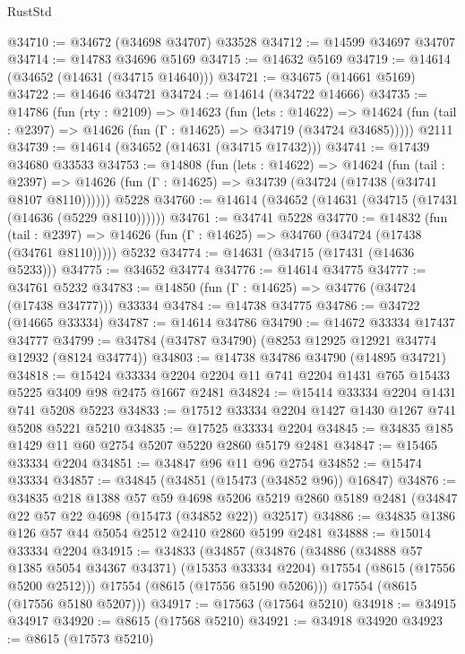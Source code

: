\begin{lexlean}{RustStd}
\begin{coremodule}
@34710 := @34672 (@34698 @34707) @33528
@34712 := @14599 @34697 @34707
@34714 := @14783 @34696 @5169
@34715 := @14632 @5169
@34719 := @14614 (@34652 (@14631 (@34715 @14640)))
@34721 := @34675 (@14661 @5169)
@34722 := @14646 @34721
@34724 := @14614 (@34722 @14666)
@34735 := @14786
    (fun (rty : @2109) =>
    @14623
      (fun (lets : @14622) =>
      @14624 (fun (tail : @2397) => @14626 (fun (Γ : @14625) => @34719 (@34724 @34685)))))
    @2111
@34739 := @14614 (@34652 (@14631 (@34715 @17432)))
@34741 := @17439 @34680 @33533
@34753 := @14808
    (fun (lets : @14622) =>
    @14624
      (fun (tail : @2397) =>
      @14626 (fun (Γ : @14625) => @34739 (@34724 (@17438 (@34741 @8107 @8110))))))
    @5228
@34760 := @14614 (@34652 (@14631 (@34715 (@17431 (@14636 (@5229 @8110))))))
@34761 := @34741 @5228
@34770 := @14832
    (fun (tail : @2397) => @14626 (fun (Γ : @14625) => @34760 (@34724 (@17438 (@34761 @8110)))))
    @5232
@34774 := @14631 (@34715 (@17431 (@14636 @5233)))
@34775 := @34652 @34774
@34776 := @14614 @34775
@34777 := @34761 @5232
@34783 := @14850 (fun (Γ : @14625) => @34776 (@34724 (@17438 @34777))) @33334
@34784 := @14738 @34775
@34786 := @34722 (@14665 @33334)
@34787 := @14614 @34786
@34790 := @14672 @33334 @17437 @34777
@34799 := @34784 (@34787 @34790) (@8253 @12925 @12921 @34774 @12932 (@8124 @34774))
@34803 := @14738 @34786 @34790 (@14895 @34721)
@34818 := @15424
    @33334
    @2204
    @2204
    @11
    @741
    @2204
    @1431
    @765
    @15433
    @5225
    @3409
    @98
    @2475
    @1667
    @2481
@34824 := @15414 @33334 @2204 @1431 @741 @5208 @5223
@34833 := @17512 @33334 @2204 @1427 @1430 @1267 @741 @5208 @5221 @5210
@34835 := @17525 @33334 @2204
@34845 := @34835 @185 @1429 @11 @60 @2754 @5207 @5220 @2860 @5179 @2481
@34847 := @15465 @33334 @2204
@34851 := @34847 @96 @11 @96 @2754
@34852 := @15474 @33334
@34857 := @34845 (@34851 (@15473 (@34852 @96)) @16847)
@34876 := @34835
    @218
    @1388
    @57
    @59
    @4698
    @5206
    @5219
    @2860
    @5189
    @2481
    (@34847 @22 @57 @22 @4698 (@15473 (@34852 @22)) @32517)
@34886 := @34835 @1386 @126 @57 @44 @5054 @2512 @2410 @2860 @5199 @2481
@34888 := @15014 @33334 @2204
@34915 := @34833
    (@34857
      (@34876
        (@34886
          (@34888 @57 @1385 @5054 @34367 @34371)
          (@15353 @33334 @2204)
          @17554
          (@8615 (@17556 @5200 @2512)))
        @17554
        (@8615 (@17556 @5190 @5206)))
      @17554
      (@8615 (@17556 @5180 @5207)))
@34917 := @17563 (@17564 @5210)
@34918 := @34915 @34917
@34920 := @8615 (@17568 @5210)
@34921 := @34918 @34920
@34923 := @8615 (@17573 @5210)

\end{coremodule}
\end{lexlean}
